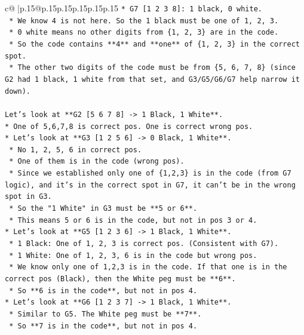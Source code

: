 \documentclass{article}
\begin{document}
{\begin{supertabular}{c@{$\;$}|p{.15\linewidth}@{}p{.15\linewidth}p{.15\linewidth}p{.15\linewidth}p{.15\linewidth}p{.15\linewidth}}
{{{\texttt{*   G7 {[}1 2 3 8{]}: 1 black, 0 white.} \\
\texttt{    *   We know 4 is not here. So the 1 black must be one of 1, 2, 3.} \\
\texttt{    *   0 white means no other digits from \{1, 2, 3\} are in the code.} \\
\texttt{    *   So the code contains **4** and **one** of \{1, 2, 3\} in the correct spot.} \\
\texttt{    *   The other two digits of the code must be from \{5, 6, 7, 8\} (since G2 had 1 black, 1 white from that set, and G3/G5/G6/G7 help narrow it down).} \\
\\ 
\texttt{Let's look at **G2 {[}5 6 7 8{]} {-}> 1 Black, 1 White**.} \\
\texttt{*   One of 5,6,7,8 is correct pos. One is correct wrong pos.} \\
\texttt{*   Let's look at **G3 {[}1 2 5 6{]} {-}> 0 Black, 1 White**.} \\
\texttt{    *   No 1, 2, 5, 6 in correct pos.} \\
\texttt{    *   One of them is in the code (wrong pos).} \\
\texttt{    *   Since we established only one of \{1,2,3\} is in the code (from G7 logic), and it's in the correct spot in G7, it can't be in the wrong spot in G3.} \\
\texttt{    *   So the "1 White" in G3 must be **5 or 6**.} \\
\texttt{    *   This means 5 or 6 is in the code, but not in pos 3 or 4.} \\
\texttt{*   Let's look at **G5 {[}1 2 3 6{]} {-}> 1 Black, 1 White**.} \\
\texttt{    *   1 Black: One of 1, 2, 3 is correct pos. (Consistent with G7).} \\
\texttt{    *   1 White: One of 1, 2, 3, 6 is in the code but wrong pos.} \\
\texttt{    *   We know only one of 1,2,3 is in the code. If that one is in the correct pos (Black), then the White peg must be **6**.} \\
\texttt{    *   So **6 is in the code**, but not in pos 4.} \\
\texttt{*   Let's look at **G6 {[}1 2 3 7{]} {-}> 1 Black, 1 White**.} \\
\texttt{    *   Similar to G5. The White peg must be **7**.} \\
\texttt{    *   So **7 is in the code**, but not in pos 4.} \\
}}}
\end{supertabular}}
\end{document}
